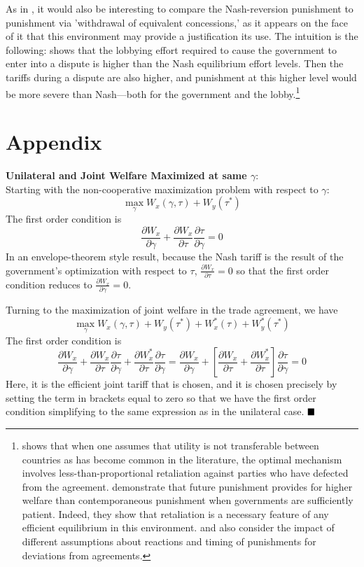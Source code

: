 \documentclass[12pt]{article}
\newcommand{\ga}{\gamma}
\begin{document}
As in \Textcite{zissimos}, it would also be interesting to compare the Nash-reversion punishment to punishment via 'withdrawal of equivalent concessions,' as it appears on the face of it that this environment may provide a justification its use. The intuition is the following: \Textcite{buzard2013a} shows that the lobbying effort required to cause the government to enter into a dispute is higher than the Nash equilibrium effort levels. Then the tariffs during a dispute are also higher, and punishment at this higher level would be more severe than Nash---both for the government and the lobby.\footnote{\Textcite{beshkar2010a} shows that when one assumes that utility is not transferable between countries as has become common in the literature, the optimal mechanism involves less-than-proportional retaliation against parties who have defected from the agreement. \Textcite{martinvergote} demonstrate that future punishment provides for higher welfare than contemporaneous punishment when governments are sufficiently patient. Indeed, they show that retaliation is a necessary feature of any efficient equilibrium in this environment. \Textcite{hungerford} and \Textcite{riezman1991} also consider the impact of different assumptions about reactions and timing of punishments for deviations from agreements.}


\section{Appendix}
\noindent \textbf{\hypertarget{envelope}{Unilateral and Joint Welfare Maximized at same $\ga$}}: \\
Starting with the non-cooperative maximization problem with respect to $\ga$:
\[
 \max_{\ga} W_x(\ga,\tau) + W_y(\tau^*)
\]
The first order condition is
\[
	\frac{\partial W_x}{\partial \ga} + \frac{\partial W_x}{\partial \tau}\frac{\partial \tau}{\partial \ga} = 0
\]
In an envelope-theorem style result, because the Nash tariff is the result of the government's optimization with respect to $\tau$, $\frac{\partial W_x}{\partial \tau}=0$ so that the first order condition reduces to $\frac{\partial W_x}{\partial \ga} = 0$.
				
Turning to the maximization of joint welfare in the trade agreement, we have
\[
  \max_{\ga} W_x(\ga,\tau) + W_y(\tau^*) + W_x^*(\tau)+ W_y^*(\tau^*)
\]
The first order condition is 
\[
  \frac{\partial W_x}{\partial \ga} + \frac{\partial W_x}{\partial \tau}\frac{\partial \tau}{\partial \ga} + \frac{\partial W_x^*}{\partial \tau}\frac{\partial \tau}{\partial \ga} = \frac{\partial W_x}{\partial \ga} + \left[ \frac{\partial W_x}{\partial \tau} + \frac{\partial W_x^*}{\partial \tau}\right]\frac{\partial \tau}{\partial \ga} = 0
\]
Here, it is the efficient joint tariff that is chosen, and it is chosen precisely by setting the term in brackets equal to zero so that we have the first order condition simplifying to the same expression as in the unilateral case. $\hfill\blacksquare$
\end{document}
